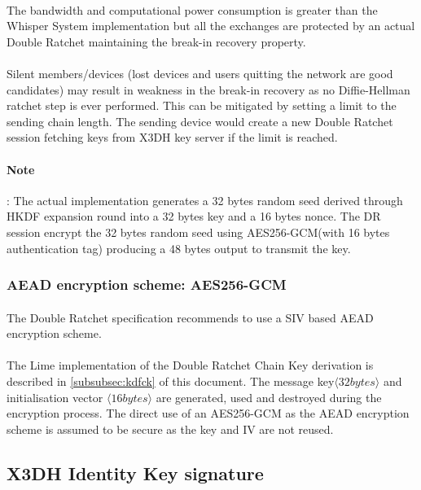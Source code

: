 \documentclass[a4paper,11pt]{article}
\begin{document}
    \paragraph{}The bandwidth and computational power consumption is greater than the Whisper System implementation but all the exchanges are protected by an actual Double Ratchet maintaining the break-in recovery property.
    \paragraph{}Silent members/devices (lost devices and users quitting the network are good candidates) may result in weakness in the break-in recovery as no Diffie-Hellman ratchet step is ever performed. This can be mitigated by setting a limit to the sending chain length. The sending device would create a new Double Ratchet session fetching keys from X3DH key server if the limit is reached.
    \paragraph{Note}: The actual implementation generates a 32 bytes random seed derived through HKDF\cite{rfc5869} expansion round into a 32 bytes key and a 16 bytes nonce. The DR session encrypt the 32 bytes random seed using AES256-GCM(with 16 bytes authentication tag) producing a 48 bytes output to transmit the key.
  
  \subsubsection{AEAD encryption scheme: AES256-GCM}
  \paragraph{}The Double Ratchet specification\cite[section 5.2]{doubleRatchet} recommends to use a SIV based AEAD encryption scheme.
  \paragraph{}The Lime implementation of the Double Ratchet Chain Key derivation is described in \ref{subsubsec:kdfck} of this document. The message key$\langle 32 bytes\rangle$ and initialisation vector $\langle 16 bytes\rangle $ are generated, used and destroyed during the encryption process. The direct use of an AES256-GCM as the AEAD encryption scheme is assumed to be secure as the key and IV are not reused.

  \subsection{X3DH Identity Key signature}
    \label{subsec:x3dhIk}
\end{document}
